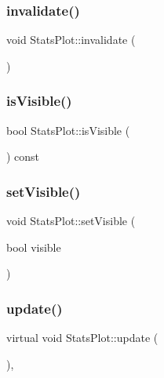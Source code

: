 \subsubsection{\texorpdfstring{invalidate()}{invalidate()}}
{\footnotesize\ttfamily void Stats\+Plot\+::invalidate (\begin{DoxyParamCaption}{ }\end{DoxyParamCaption})\hspace{0.3cm}{\ttfamily [inline]}}

\mbox{\label{class_stats_plot_a22e1c6707185a82bf8002bca835ded00}} 
\subsubsection{\texorpdfstring{isVisible()}{isVisible()}}
{\footnotesize\ttfamily bool Stats\+Plot\+::is\+Visible (\begin{DoxyParamCaption}{ }\end{DoxyParamCaption}) const\hspace{0.3cm}{\ttfamily [inline]}}

\mbox{\label{class_stats_plot_afee63728cb75a6aeedb693cb7a00f4c5}} 
\subsubsection{\texorpdfstring{setVisible()}{setVisible()}}
{\footnotesize\ttfamily void Stats\+Plot\+::set\+Visible (\begin{DoxyParamCaption}\item[{bool}]{visible }\end{DoxyParamCaption})\hspace{0.3cm}{\ttfamily [inline]}}

\mbox{\label{class_stats_plot_a289e6689c9d7104f730b8d5abfc44646}} 
\subsubsection{\texorpdfstring{update()}{update()}}
{\footnotesize\ttfamily virtual void Stats\+Plot\+::update (\begin{DoxyParamCaption}{ }\end{DoxyParamCaption})\hspace{0.3cm}{\ttfamily [inline]}, {\ttfamily [virtual]}}



